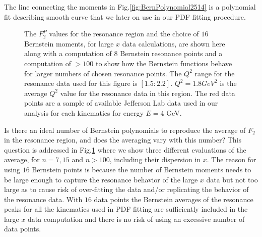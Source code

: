 \documentclass[
twocolumn,
aps,prd,
nofootinbib,
superscriptaddress,
showpacs,ligh
tightenlines, 
]{revtex4}
\begin{document}
The line connecting the moments in Fig.\ref{fig:BernPolynomial2514} is a polynomial fit describing smooth curve that we later on use in our PDF fitting procedure. 

\begin{figure}[htp] 
\caption[The $F_{2}^{P}$ values for the resonance region and Bernstein moments for $8$, $16$,$169$ resonance points]{The $F_{2}^{P}$ values for the resonance region and the choice of $16$ Bernstein moments, for large $x$ data calculations, are shown here along with a computation of $8$ Bernstein resonance points and a computation of $> 100$ to show how the Bernstein functions behave for larger numbers of chosen resonance points. The $Q^{2}$ range for the resonance data used for this figure is $[1.5:2.2]$.  $Q^{2} = 1.8 GeV^{2}$ is the average $Q^{2}$ value for the resonance data in this region. The red data points are a sample of available Jefferson Lab data used in our analysis for each kinematics \cite{hallc} for energy $E = 4$ GeV.  }
\label{fig:FinalBern34PPPMAX}
\end{figure}
Is there an ideal number of Bernstein polynomials to reproduce the average of $F_2$ in the resonance region, and does the averaging vary with this number?
This question is addressed in Fig.\ref{fig:FinalBern34PPPMAX} where we show three different evaluations of the average, for $n=7,15$ and $n>100$, including their dispersion in $x$. 
The reason for using $16$ Bernstein points is because the number of Bernstein moments needs to be large enough to capture the resonance behavior of the large $x$ data but not too large as to cause risk of over-fitting the data and/or replicating the behavior of the resonance data.  With $16$ data points the Bernstein averages of the resonance peaks for all the kinematics used in PDF fitting are sufficiently included in the large $x$ data computation and there is no risk of using an excessive number of data points.
\end{document}

